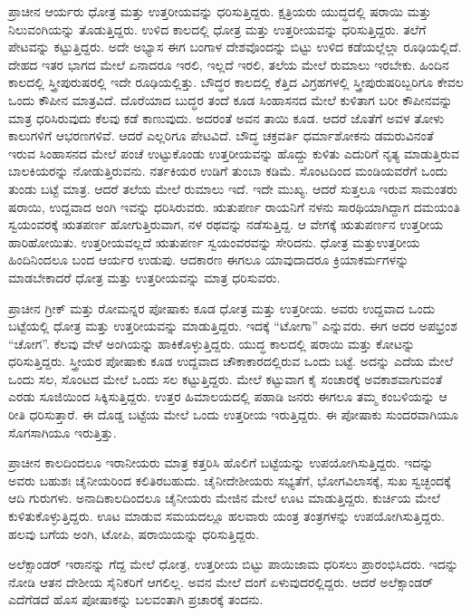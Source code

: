 ಪ್ರಾಚೀನ ಆರ್ಯರು ಧೋತ್ರ ಮತ್ತು ಉತ್ತರೀಯವನ್ನು ಧರಿಸುತ್ತಿದ್ದರು. ಕ್ಷತ್ರಿಯರು ಯುದ್ಧದಲ್ಲಿ ಷರಾಯಿ ಮತ್ತು ನಿಲುವಂಗಿಯನ್ನು ತೊಡುತ್ತಿದ್ದರು. ಉಳಿದ ಕಾಲದಲ್ಲಿ ಧೋತ್ರ ಮತ್ತು ಉತ್ತರೀಯವನ್ನು ಧರಿಸುತ್ತಿದ್ದರು. ತಲೆಗೆ ಪೇಟವನ್ನು ಕಟ್ಟುತ್ತಿದ್ದರು. ಅದೇ ಅಭ್ಯಾಸ ಈಗ ಬಂಗಾಳ ದೇಶವೊಂದನ್ನು ಬಿಟ್ಟು ಉಳಿದ ಕಡೆಯಲ್ಲೆಲ್ಲಾ ರೂಢಿಯಲ್ಲಿದೆ. ದೇಹದ ಇತರ ಭಾಗದ ಮೇಲೆ ಏನಾದರೂ ಇರಲಿ, ಇಲ್ಲದೆ ಇರಲಿ, ತಲೆಯ ಮೇಲೆ ರುಮಾಲು ಇರಬೇಕು. ಹಿಂದಿನ ಕಾಲದಲ್ಲಿ ಸ್ತ್ರೀಪುರುಷರಲ್ಲಿ ಇದೇ ರೂಢಿಯಲ್ಲಿತ್ತು. ಬೌದ್ಧರ ಕಾಲದಲ್ಲಿ ಕೆತ್ತಿದ ವಿಗ್ರಹಗಳಲ್ಲಿ ಸ್ತ್ರೀಪುರುಷರಿಬ್ಬರಿಗೂ ಕೇವಲ ಒಂದು ಕೌಪೀನ ಮಾತ್ರವಿದೆ. ದೊರೆಯಾದ ಬುದ್ಧರ ತಂದೆ ಕೂಡ ಸಿಂಹಾಸನದ ಮೇಲೆ ಕುಳಿತಾಗ ಬರೀ ಕೌಪೀನವನ್ನು ಮಾತ್ರ ಧರಿಸಿರುವುದು ಕೆಲವು ಕಡೆ ಕಾಣುವುದು. ಅದರಂತೆ ಅವನ ತಾಯಿ ಕೂಡ. ಆದರೆ ಜೊತೆಗೆ ಅವಳ ತೋಳು ಕಾಲುಗಳಿಗೆ ಆಭರಣಗಳಿವೆ. ಆದರೆ ಎಲ್ಲರಿಗೂ ಪೇಟವಿದೆ. ಬೌದ್ಧ ಚಕ್ರವರ್ತಿ ಧರ್ಮಾಶೋಕನು ಡಮರುವಿನಂತೆ ಇರುವ ಸಿಂಹಾಸನದ ಮೇಲೆ ಪಂಚೆ ಉಟ್ಟುಕೊಂಡು ಉತ್ತರೀಯವನ್ನು ಹೊದ್ದು ಕುಳಿತು ಎದುರಿಗೆ ನೃತ್ಯ ಮಾಡುತ್ತಿರುವ ಬಾಲಕಿಯರನ್ನು ನೋಡುತ್ತಿರುವನು. ನರ್ತಕಿಯರ ಉಡಿಗೆ ತುಂಬಾ ಕಡಿಮೆ. ಸೊಂಟದಿಂದ ಮಂಡಿಯವರೆಗೆ ಒಂದು ತುಂಡು ಬಟ್ಟೆ ಮಾತ್ರ. ಆದರೆ ತಲೆಯ ಮೇಲೆ ರುಮಾಲು ಇದೆ. ಇದೇ ಮುಖ್ಯ. ಆದರೆ ಸುತ್ತಲೂ ಇರುವ ಸಾಮಂತರು ಷರಾಯಿ, ಉದ್ದವಾದ ಅಂಗಿ ಇವನ್ನು ಧರಿಸಿರುವರು. ಋತುಪರ್ಣ ರಾಯನಿಗೆ ನಳನು ಸಾರಥಿಯಾಗಿದ್ದಾಗ ದಮಯಂತಿ ಸ್ವಯಂವರಕ್ಕೆ ಋತಪರ್ಣ ಹೋಗುತ್ತಿರುವಾಗ, ನಳ ರಥವನ್ನು ನಡೆಸುತ್ತಿದ್ದ. ಆ ವೇಗಕ್ಕೆ ಋತುಪರ್ಣನ ಉತ್ತರೀಯ ಹಾರಿಹೋಯಿತು. ಉತ್ತರೀಯವಲ್ಲದೆ ಋತುಪರ್ಣ ಸ್ವಯಂವರವನ್ನು ಸೇರಿದನು. ಧೋತ್ರ ಮತ್ತು\break ಉತ್ತರೀಯ ಹಿಂದಿನಿಂದಲೂ ಬಂದ ಆರ್ಯರ ಉಡುಪು. ಆದಕಾರಣ ಈಗಲೂ ಯಾವುದಾದರೂ ಕ್ರಿಯಾಕರ್ಮಗಳನ್ನು ಮಾಡಬೇಕಾದರೆ ಧೋತ್ರ ಮತ್ತು ಉತ್ತರೀಯವನ್ನು ಮಾತ್ರ ಧರಿಸುವರು.

ಪ್ರಾಚೀನ ಗ್ರೀಕ್​ ಮತ್ತು ರೋಮನ್ನರ ಪೋಷಾಕು ಕೂಡ ಧೋತ್ರ ಮತ್ತು ಉತ್ತರೀಯ. ಅವರು ಉದ್ದವಾದ ಒಂದು ಬಟ್ಟೆಯಲ್ಲಿ ಧೋತ್ರ ಮತ್ತು ಉತ್ತರೀಯವನ್ನು ಮಾಡುತ್ತಿದ್ದರು. ಇದಕ್ಕೆ “ಟೋಗಾ” ಎನ್ನುವರು. ಈಗ ಅದರ ಅಪಭ್ರಂಶ “ಚೋಗ”. ಕೆಲವು ವೇಳೆ ಅಂಗಿಯನ್ನು ಹಾಕಿಕೊಳ್ಳುತ್ತಿದ್ದರು. ಯುದ್ಧ ಕಾಲದಲ್ಲಿ ಷರಾಯಿ ಮತ್ತು ಕೋಟನ್ನು ಧರಿಸುತ್ತಿದ್ದರು. ಸ್ತ್ರೀಯರ ಪೋಷಾಕು ಕೂಡ ಉದ್ದವಾದ ಚೌಕಾಕಾರದಲ್ಲಿರುವ ಒಂದು ಬಟ್ಟೆ. ಅದನ್ನು ಎದೆಯ ಮೇಲೆ ಒಂದು ಸಲ, ಸೊಂಟದ ಮೇಲೆ ಒಂದು ಸಲ ಕಟ್ಟುತ್ತಿದ್ದರು. ಮೇಲೆ ಕಟ್ಟುವಾಗ ಕೈ ಸಂಚಾರಕ್ಕೆ ಅವಕಾಶವಾಗುವಂತೆ ಎರಡು ಸೂಜಿಯಿಂದ ಸಿಕ್ಕಿಸುತ್ತಿದ್ದರು. ಉತ್ತರ ಹಿಮಾಲಯದಲ್ಲಿ ಪಹಾಡಿ ಜನರು ಈಗಲೂ ತಮ್ಮ ಕಂಬಳಿಯನ್ನು ಆ ರೀತಿ ಧರಿಸುತ್ತಾರೆ. ಈ ದೊಡ್ಡ ಬಟ್ಟೆಯ ಮೇಲೆ ಒಂದು ಉತ್ತರೀಯ ಇರುತ್ತಿದ್ದರು. ಈ ಪೋಷಾಕು ಸುಂದರವಾಗಿಯೂ ಸೊಗಸಾಗಿಯೂ ಇರುತ್ತಿತ್ತು.

ಪ್ರಾಚೀನ ಕಾಲದಿಂದಲೂ ಇರಾನೀಯರು ಮಾತ್ರ ಕತ್ತರಿಸಿ ಹೊಲಿಗೆ ಬಟ್ಟೆಯನ್ನು ಉಪಯೋಗಿಸುತ್ತಿದ್ದರು. ಇದನ್ನು ಅವರು ಬಹುಶಃ ಚೈನೀಯರಿಂದ ಕಲಿತಿರಬಹುದು. ಚೈನೀದೇಶೀಯರು ಸಭ್ಯತೆಗೆ, ಭೋಗವಿಲಾಸಕ್ಕೆ, ಸುಖ ಸ್ವಚ್ಛಂದಕ್ಕೆ ಆದಿ ಗುರುಗಳು. ಅನಾದಿಕಾಲದಿಂದಲೂ ಚೈನೀಯರು ಮೇಜಿನ ಮೇಲೆ ಊಟ ಮಾಡುತ್ತಿದ್ದರು. ಕುರ್ಚಿಯ ಮೇಲೆ ಕುಳಿತುಕೊಳ್ಳುತ್ತಿದ್ದರು. ಊಟ ಮಾಡುವ ಸಮಯದಲ್ಲೂ ಹಲವಾರು ಯಂತ್ರ ತಂತ್ರಗಳನ್ನು ಉಪಯೋಗಿಸುತ್ತಿದ್ದರು. ಹಲವು ಬಗೆಯ ಅಂಗಿ, ಟೋಪಿ, ಷರಾಯಿಯನ್ನು ಧರಿಸುತ್ತಿದ್ದರು.

ಅಲೆಕ್ಸಾಂಡರ್​ ಇರಾನನ್ನು ಗೆದ್ದ ಮೇಲೆ ಧೋತ್ರ, ಉತ್ತರೀಯ ಬಿಟ್ಟು ಪಾಯಿಜಾಮ ಧರಿಸಲು ಪ್ರಾರಂಭಿಸಿದರು. ಇದನ್ನು ನೋಡಿ ಆತನ ದೇಶೀಯ ಸೈನಿಕರಿಗೆ ಆಗಲಿಲ್ಲ. ಅವನ ಮೇಲೆ ದಂಗೆ ಏಳುವುದರಲ್ಲಿದ್ದರು. ಆದರೆ ಅಲೆಕ್ಸಾಂಡರ್​ ಎದೆಗೆಡದೆ ಹೊಸ ಪೋಷಾಕನ್ನು ಬಲವಂತಾಗಿ ಪ್ರಚಾರಕ್ಕೆ ತಂದನು.

